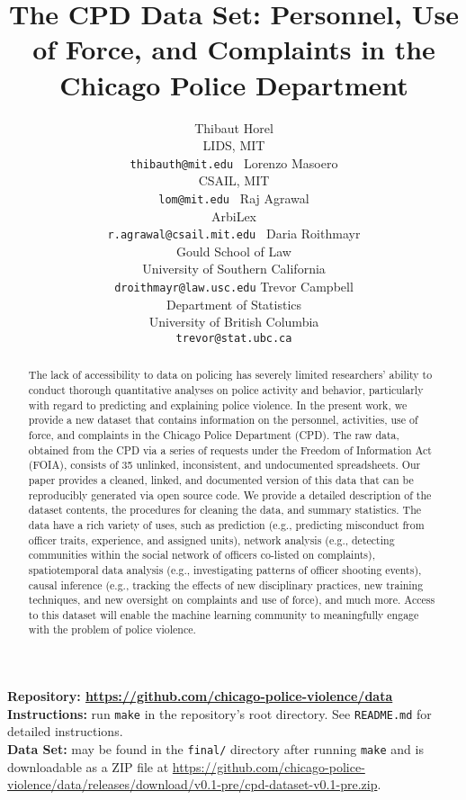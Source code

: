 \documentclass{article}
\title{The CPD Data Set: Personnel, Use of Force, and Complaints in the Chicago Police Department}
\author{%
  Thibaut Horel\\
  LIDS, MIT \\
  \texttt{thibauth@mit.edu } 
  \And
  Lorenzo Masoero\\
  CSAIL, MIT \\
  \texttt{lom@mit.edu } 
   \And
 Raj Agrawal\\
  ArbiLex\\
  \texttt{r.agrawal@csail.mit.edu } 
   \And
  Daria Roithmayr\\
  Gould School of Law \\
  University of Southern California  \\
  \texttt{droithmayr@law.usc.edu}
 \And 
 Trevor Campbell \\
  Department of Statistics \\
   University of British Columbia\\
  \texttt{trevor@stat.ubc.ca}
}
\begin{document}
\maketitle

\begin{abstract}
\relax
The lack of accessibility to data on policing has severely limited researchers'
ability to conduct thorough quantitative analyses on police activity and
behavior, particularly with regard to predicting and explaining police
violence. In the present work, we provide a new dataset that contains
information on the personnel, activities, use of force, and complaints in the
Chicago Police Department (CPD). The raw data, obtained from the CPD via a
series of requests under the Freedom of Information Act (FOIA), consists of 35
unlinked, inconsistent, and undocumented spreadsheets. Our paper provides a
cleaned, linked, and documented version of this data that can be reproducibly
generated via open source code. We provide a detailed description of the
dataset contents, the procedures for cleaning the data, and summary statistics.
The data have a rich variety of uses, such as prediction (e.g., predicting
misconduct from officer traits, experience, and assigned units), network
analysis (e.g., detecting communities within the social network of officers
co-listed on complaints), spatiotemporal data analysis (e.g., investigating
patterns of officer shooting events), causal inference (e.g., tracking the
effects of new disciplinary practices, new training techniques, and new
oversight on complaints and use of force), and much more. Access to this
dataset will enable the machine learning community to meaningfully engage with
the problem of police violence.
\end{abstract}

\textbf{Repository: \url{https://github.com/chicago-police-violence/data}}\\
\textbf{Instructions:} run \texttt{make} in the repository's root directory.
See \texttt{README.md} for detailed instructions.\\
\textbf{Data Set:} may be found in the \texttt{final/} directory after running \texttt{make} and is downloadable as a ZIP file at \url{https://github.com/chicago-police-violence/data/releases/download/v0.1-pre/cpd-dataset-v0.1-pre.zip}.







\end{document}
